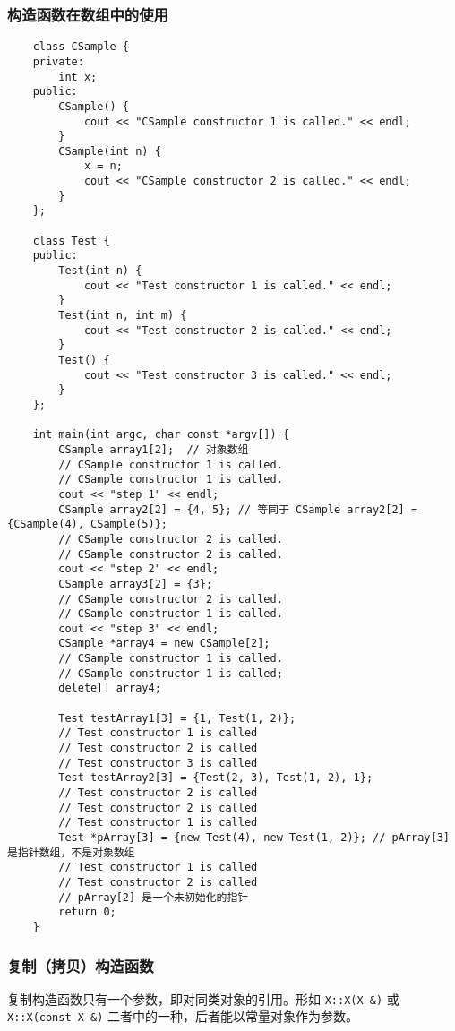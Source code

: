 \documentclass[UTF8]{ctexart}
\begin{document}
\subsubsection{构造函数在数组中的使用}
\begin{verbatim}
    class CSample {
    private:
        int x;
    public:
        CSample() {
            cout << "CSample constructor 1 is called." << endl;
        }
        CSample(int n) {
            x = n;
            cout << "CSample constructor 2 is called." << endl;
        }
    };

    class Test {
    public:
        Test(int n) {
            cout << "Test constructor 1 is called." << endl;
        }
        Test(int n, int m) {
            cout << "Test constructor 2 is called." << endl;
        }
        Test() {
            cout << "Test constructor 3 is called." << endl;
        }
    };

    int main(int argc, char const *argv[]) {
        CSample array1[2];  // 对象数组
        // CSample constructor 1 is called.
        // CSample constructor 1 is called.
        cout << "step 1" << endl;
        CSample array2[2] = {4, 5}; // 等同于 CSample array2[2] = {CSample(4), CSample(5)};
        // CSample constructor 2 is called.
        // CSample constructor 2 is called.
        cout << "step 2" << endl;
        CSample array3[2] = {3};
        // CSample constructor 2 is called.
        // CSample constructor 1 is called.
        cout << "step 3" << endl;
        CSample *array4 = new CSample[2];
        // CSample constructor 1 is called.
        // CSample constructor 1 is called;
        delete[] array4;

        Test testArray1[3] = {1, Test(1, 2)};
        // Test constructor 1 is called
        // Test constructor 2 is called
        // Test constructor 3 is called
        Test testArray2[3] = {Test(2, 3), Test(1, 2), 1};
        // Test constructor 2 is called
        // Test constructor 2 is called
        // Test constructor 1 is called
        Test *pArray[3] = {new Test(4), new Test(1, 2)}; // pArray[3] 是指针数组，不是对象数组
        // Test constructor 1 is called
        // Test constructor 2 is called
        // pArray[2] 是一个未初始化的指针
        return 0;
    }
\end{verbatim}

\subsubsection{复制（拷贝）构造函数}
复制构造函数只有一个参数，即对同类对象的引用。形如 \texttt{X::X(X &)} 或
\texttt{X::X(const X &)} 二者中的一种，后者能以常量对象作为参数。
\end{document}
